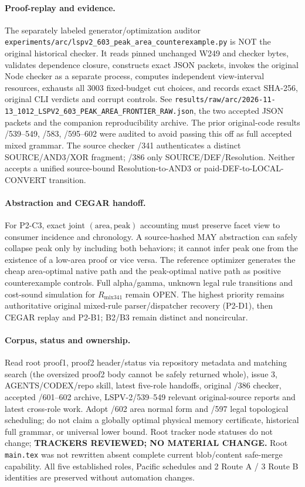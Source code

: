 \paragraph{Proof-replay and evidence.}
The separately labeled generator/optimization auditor \texttt{experiments/arc/lspv2\_603\_peak\_area\_counterexample.py} is NOT the original historical checker. It reads pinned unchanged W249 and checker bytes, validates dependence closure, constructs exact JSON packets, invokes the original Node checker as a separate process, computes independent view-interval resources, exhausts all 3003 fixed-budget cut choices, and records exact SHA-256, original CLI verdicts and corrupt controls. See \texttt{results/raw/arc/2026-11-13\_1012\_LSPV2\_603\_PEAK\_AREA\_FRONTIER\_RAW.json}, the two accepted JSON packets and the companion reproducibility archive. The prior original-code results /539--549, /583, /595--602 were audited to avoid passing this off as full accepted mixed grammar. The source checker /341 authenticates a distinct SOURCE/AND3/XOR fragment; /386 only SOURCE/DEF/Resolution. Neither accepts a unified source-bound Resolution-to-AND3 or paid-DEF-to-LOCAL-CONVERT transition.

\paragraph{Abstraction and CEGAR handoff.}
For P2-C3, exact joint $(\text{area},\text{peak})$ accounting must preserve facet view to consumer incidence and chronology. A source-hashed MAY abstraction can safely collapse peak only by including both behaviors; it cannot infer peak one from the existence of a low-area proof or vice versa. The reference optimizer generates the cheap area-optimal native path and the peak-optimal native path as positive counterexample controls. Full alpha/gamma, unknown legal rule transitions and cost-sound simulation for $R_{\mathrm{mix341}}$ remain OPEN. The highest priority remains authoritative original mixed-rule parser/dispatcher recovery (P2-D1), then CEGAR replay and P2-B1; B2/B3 remain distinct and noncircular.

\paragraph{Corpus, status and ownership.}
Read root proof1, proof2 header/status via repository metadata and matching search (the oversized proof2 body cannot be safely returned whole), issue 3, AGENTS/CODEX/repo skill, latest five-role handoffs, original /386 checker, accepted /601--602 archive, LSPV-2/539--549 relevant original-source reports and latest cross-role work. Adopt /602 area normal form and /597 legal topological scheduling; do not claim a globally optimal physical memory certificate, historical full grammar, or universal lower bound. Root tracker node statuses do not change; \textbf{TRACKERS REVIEWED; NO MATERIAL CHANGE.} Root \texttt{main.tex} was not rewritten absent complete current blob/content safe-merge capability. All five established roles, Pacific schedules and 2 Route A / 3 Route B identities are preserved without automation changes.

